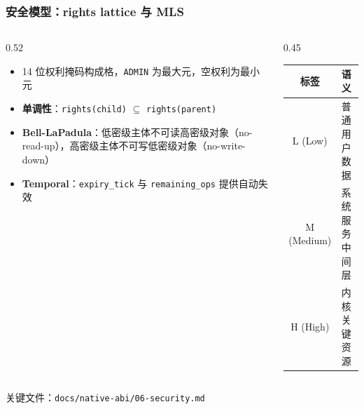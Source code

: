 \documentclass[aspectratio=1610]{beamer}
\newcommand{\code}[1]{\texttt{\footnotesize #1}}
\begin{document}
\begin{frame}
    \frametitle{安全模型：rights lattice 与 MLS}
    \begin{columns}
        \begin{column}{0.52\textwidth}
            \footnotesize
            \begin{itemize}
                \item 14 位权利掩码构成格，\code{ADMIN} 为最大元，空权利为最小元
                \item \textbf{单调性}：\code{rights(child)} $\subseteq$ \code{rights(parent)}
                \item \textbf{Bell-LaPadula}：低密级主体不可读高密级对象（no-read-up），高密级主体不可写低密级对象（no-write-down）
                \item \textbf{Temporal}：\code{expiry\_tick} 与 \code{remaining\_ops} 提供自动失效
            \end{itemize}
        \end{column}
        \begin{column}{0.45\textwidth}
            \footnotesize
            \begin{table}
                \centering
                \renewcommand{\arraystretch}{1.1}
                \begin{tabular}{cl}
                    \toprule
                    \textbf{标签} & \textbf{语义} \\
                    \midrule
                    L (Low) & 普通用户数据 \\
                    M (Medium) & 系统服务中间层 \\
                    H (High) & 内核关键资源 \\
                    \bottomrule
                \end{tabular}
            \end{table}
        \end{column}
    \end{columns}
    \vspace{0.3em}
    \small 关键文件：\code{docs/native-abi/06-security.md}
\end{frame}
\end{document}
